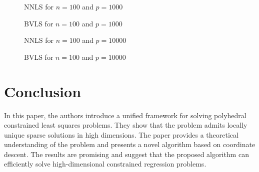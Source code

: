 \documentclass[11pt]{article}
\begin{document}
\begin{figure}[H]
    \centering
    \hspace*{-0.8in}
    \caption{NNLS for $n = 100$ and $p = 1000$}

    \hspace*{-0.8in}
    \caption{BVLS for $n = 100$ and $p = 1000$}

    \hspace*{-0.8in}
    \caption{NNLS for $n = 100$ and $p = 10000$}

    \hspace*{-0.8in}
    \caption{BVLS for $n = 100$ and $p = 10000$}
\end{figure}

\section{Conclusion}
In this paper, the authors introduce a unified framework for solving polyhedral constrained least
squares problems. They show that the problem admits locally unique sparse solutions in high
dimensions. The paper provides a theoretical understanding of the problem and presents a novel
algorithm based on coordinate descent. The results are promising and suggest that the proposed
algorithm can efficiently solve high-dimensional constrained regression problems.
\end{document}
